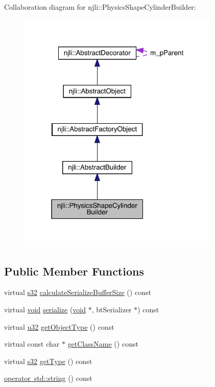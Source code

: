 Collaboration diagram for njli\+:\+:Physics\+Shape\+Cylinder\+Builder\+:\nopagebreak
\begin{figure}[H]
\begin{center}
\leavevmode
\includegraphics[width=274pt]{classnjli_1_1_physics_shape_cylinder_builder__coll__graph}
\end{center}
\end{figure}
\subsection*{Public Member Functions}
\begin{DoxyCompactItemize}
\item 
virtual \mbox{\hyperlink{_util_8h_aa62c75d314a0d1f37f79c4b73b2292e2}{s32}} \mbox{\hyperlink{classnjli_1_1_physics_shape_cylinder_builder_aab0845692e06379082872427ec25b2b9}{calculate\+Serialize\+Buffer\+Size}} () const
\item 
virtual \mbox{\hyperlink{_thread_8h_af1e856da2e658414cb2456cb6f7ebc66}{void}} \mbox{\hyperlink{classnjli_1_1_physics_shape_cylinder_builder_a3f5771845a33f76782dfbf1a5b7db31c}{serialize}} (\mbox{\hyperlink{_thread_8h_af1e856da2e658414cb2456cb6f7ebc66}{void}} $\ast$, bt\+Serializer $\ast$) const
\item 
virtual \mbox{\hyperlink{_util_8h_a10e94b422ef0c20dcdec20d31a1f5049}{u32}} \mbox{\hyperlink{classnjli_1_1_physics_shape_cylinder_builder_ad0664106b9916319c22dc2f3e1d667a2}{get\+Object\+Type}} () const
\item 
virtual const char $\ast$ \mbox{\hyperlink{classnjli_1_1_physics_shape_cylinder_builder_ac345af0509040d7b42273277c77e9ae5}{get\+Class\+Name}} () const
\item 
virtual \mbox{\hyperlink{_util_8h_aa62c75d314a0d1f37f79c4b73b2292e2}{s32}} \mbox{\hyperlink{classnjli_1_1_physics_shape_cylinder_builder_a898b197c3dcc879ee1ce5d6ccf08b960}{get\+Type}} () const
\item 
\mbox{\hyperlink{classnjli_1_1_physics_shape_cylinder_builder_a52973d70f5318a2ded0156e91c79b577}{operator std\+::string}} () const
\end{DoxyCompactItemize}

